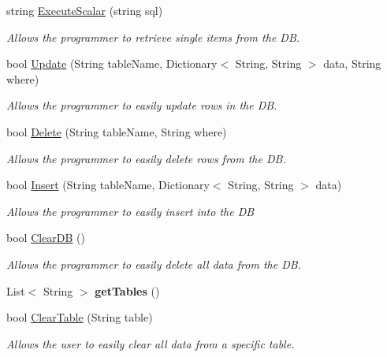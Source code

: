 \begin{DoxyCompactItemize}
string \hyperlink{class_s_q_lite_database_a330f9baa1179004fbe7bdd5a3cc2930d}{Execute\-Scalar} (string sql)
\begin{DoxyCompactList}\small\item\em Allows the programmer to retrieve single items from the D\-B. \end{DoxyCompactList}\item 
bool \hyperlink{class_s_q_lite_database_a0458d1ad962e59b6602f3b58c600fb8e}{Update} (String table\-Name, Dictionary$<$ String, String $>$ data, String where)
\begin{DoxyCompactList}\small\item\em Allows the programmer to easily update rows in the D\-B. \end{DoxyCompactList}\item 
bool \hyperlink{class_s_q_lite_database_a9cbab6bb03bdd2529dd0154de5261459}{Delete} (String table\-Name, String where)
\begin{DoxyCompactList}\small\item\em Allows the programmer to easily delete rows from the D\-B. \end{DoxyCompactList}\item 
bool \hyperlink{class_s_q_lite_database_afb8919879352e752ef7e8d6f99bc5882}{Insert} (String table\-Name, Dictionary$<$ String, String $>$ data)
\begin{DoxyCompactList}\small\item\em Allows the programmer to easily insert into the D\-B \end{DoxyCompactList}\item 
bool \hyperlink{class_s_q_lite_database_adfc1377fd6c1b46bc685944c1577ae68}{Clear\-D\-B} ()
\begin{DoxyCompactList}\small\item\em Allows the programmer to easily delete all data from the D\-B. \end{DoxyCompactList}\item 
\hypertarget{class_s_q_lite_database_add78f4e6f1d7b9631bd21503f6d29e67}{List$<$ String $>$ {\bfseries get\-Tables} ()}\label{class_s_q_lite_database_add78f4e6f1d7b9631bd21503f6d29e67}

\item 
bool \hyperlink{class_s_q_lite_database_a0afb4ab2317c329ae68a3c7da59329ee}{Clear\-Table} (String table)
\begin{DoxyCompactList}\small\item\em Allows the user to easily clear all data from a specific table. \end{DoxyCompactList}\end{DoxyCompactItemize}


